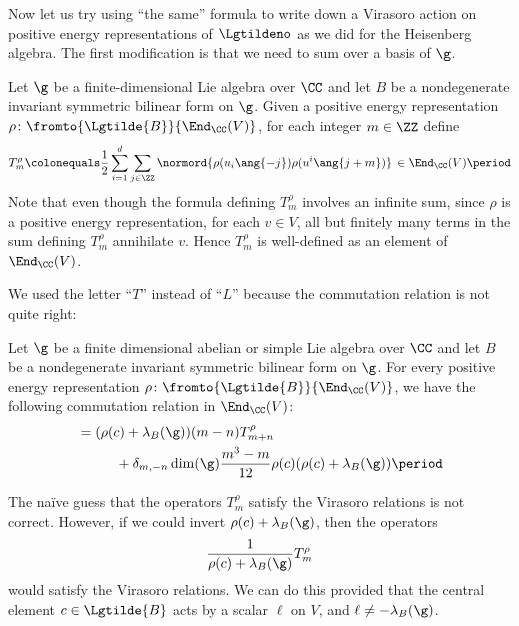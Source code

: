 Now let us try using ``the same'' formula to write down a Virasoro action on positive energy representations of $ \Lgtildeno $ as we did for the Heisenberg algebra.
The first modification is that we need to sum over a basis of $ \g $.

\begin{construction}
	Let $ \g $ be a finite-dimensional Lie algebra over $ \CC $ and let $ B $ be a nondegenerate invariant symmetric bilinear form on $ \g $.
	Given a positive energy representation $ \rho \colon \fromto{\Lgtilde{B}}{\End_{\CC}(V)} $, for each integer $ m \in \ZZ $ define
	\begin{equation*}
		T_m^{\rho} \colonequals \frac{1}{2} \sum_{i = 1}^d \sum_{j \in \ZZ} \normord{\rho(u_i\ang{-j}) \rho(u^i\ang{j+m})} \, \in \End_{\CC}(V) \period
	\end{equation*}
	Note that even though the formula defining $ T_m^{\rho} $ involves an infinite sum, since $ \rho $ is a positive energy representation, for each $ v \in V $, all but finitely many terms in the sum defining $ T_m^{\rho} $ annihilate $ v $.
	Hence $ T_m^{\rho} $ is well-defined as an element of $ \End_{\CC}(V) $. 
\end{construction}

We used the letter ``$ T $'' instead of ``$ L $'' because the commutation relation is not quite right:

\begin{lemma}[{\cite[Theorem 10.1]{MR1021978}}]
	Let $ \g $ be a finite dimensional abelian or simple Lie algebra over $ \CC $ and let $ B $ be a nondegenerate invariant symmetric bilinear form on $ \g $.
	For every positive energy representation $ \rho \colon \fromto{\Lgtilde{B}}{\End_{\CC}(V)} $, we have the following commutation relation in $ \End_{\CC}(V) $:
	\begin{align*}
		[T_m^{\rho},T_n^{\rho}] &= (\rho(c) + \lambda_B(\g))(m - n) T_{m+n}^{\rho} \\ 
		&\phantom{=} \qquad + \delta_{m,-n} \dim(\g) \frac{m^3 - m}{12} \rho(c) (\rho(c) + \lambda_B(\g))  \period 
	\end{align*}
\end{lemma}

\begin{idea}
	The naïve guess that the operators $ T_m^{\rho} $ satisfy the Virasoro relations is not correct. 
	However, if we could invert $ \rho(c) + \lambda_B(\g) $, then the operators
	\begin{equation*}
		\frac{1}{\rho(c) + \lambda_B(\g)} T_m^{\rho} 
	\end{equation*}
	would satisfy the Virasoro relations.
	We can do this provided that the central element $ c \in \Lgtilde{B} $ acts by a scalar $ \ell $ on $ V $, and $ \ell \neq -\lambda_B(\g) $.
\end{idea}

